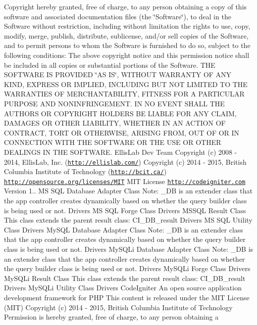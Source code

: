 \begin{DoxyCopyright}{Copyright}
hereby granted, free of charge, to any person obtaining a copy of this software and associated documentation files (the \char`\"{}\+Software\char`\"{}), to deal in the Software without restriction, including without limitation the rights to use, copy, modify, merge, publish, distribute, sublicense, and/or sell copies of the Software, and to permit persons to whom the Software is furnished to do so, subject to the following conditions\+: The above copyright notice and this permission notice shall be included in all copies or substantial portions of the Software. T\+H\+E S\+O\+F\+T\+W\+A\+R\+E I\+S P\+R\+O\+V\+I\+D\+E\+D \char`\"{}\+A\+S I\+S\char`\"{}, W\+I\+T\+H\+O\+U\+T W\+A\+R\+R\+A\+N\+T\+Y O\+F A\+N\+Y K\+I\+N\+D, E\+X\+P\+R\+E\+S\+S O\+R I\+M\+P\+L\+I\+E\+D, I\+N\+C\+L\+U\+D\+I\+N\+G B\+U\+T N\+O\+T L\+I\+M\+I\+T\+E\+D T\+O T\+H\+E W\+A\+R\+R\+A\+N\+T\+I\+E\+S O\+F M\+E\+R\+C\+H\+A\+N\+T\+A\+B\+I\+L\+I\+T\+Y, F\+I\+T\+N\+E\+S\+S F\+O\+R A P\+A\+R\+T\+I\+C\+U\+L\+A\+R P\+U\+R\+P\+O\+S\+E A\+N\+D N\+O\+N\+I\+N\+F\+R\+I\+N\+G\+E\+M\+E\+N\+T. I\+N N\+O E\+V\+E\+N\+T S\+H\+A\+L\+L T\+H\+E A\+U\+T\+H\+O\+R\+S O\+R C\+O\+P\+Y\+R\+I\+G\+H\+T H\+O\+L\+D\+E\+R\+S B\+E L\+I\+A\+B\+L\+E F\+O\+R A\+N\+Y C\+L\+A\+I\+M, D\+A\+M\+A\+G\+E\+S O\+R O\+T\+H\+E\+R L\+I\+A\+B\+I\+L\+I\+T\+Y, W\+H\+E\+T\+H\+E\+R I\+N A\+N A\+C\+T\+I\+O\+N O\+F C\+O\+N\+T\+R\+A\+C\+T, T\+O\+R\+T O\+R O\+T\+H\+E\+R\+W\+I\+S\+E, A\+R\+I\+S\+I\+N\+G F\+R\+O\+M, O\+U\+T O\+F O\+R I\+N C\+O\+N\+N\+E\+C\+T\+I\+O\+N W\+I\+T\+H T\+H\+E S\+O\+F\+T\+W\+A\+R\+E O\+R T\+H\+E U\+S\+E O\+R O\+T\+H\+E\+R D\+E\+A\+L\+I\+N\+G\+S I\+N T\+H\+E S\+O\+F\+T\+W\+A\+R\+E.  Ellis\+Lab Dev Team  Copyright (c) 2008 -\/ 2014, Ellis\+Lab, Inc. (\href{http://ellislab.com/}{\tt http\+://ellislab.\+com/})  Copyright (c) 2014 -\/ 2015, British Columbia Institute of Technology (\href{http://bcit.ca/}{\tt http\+://bcit.\+ca/})  \href{http://opensource.org/licenses/MIT}{\tt http\+://opensource.\+org/licenses/\+M\+I\+T} M\+I\+T License  \href{http://codeigniter.com}{\tt http\+://codeigniter.\+com}  Version 1..  M\+S S\+Q\+L Database Adapter Class Note\+: \+\_\+\+D\+B is an extender class that the app controller creates dynamically based on whether the query builder class is being used or not.  Drivers M\+S S\+Q\+L Forge Class  Drivers M\+S\+S\+Q\+L Result Class This class extends the parent result class\+: C\+I\+\_\+\+D\+B\+\_\+result  Drivers M\+S S\+Q\+L Utility Class  Drivers My\+S\+Q\+L Database Adapter Class Note\+: \+\_\+\+D\+B is an extender class that the app controller creates dynamically based on whether the query builder class is being used or not.  Drivers My\+S\+Q\+Li Database Adapter Class Note\+: \+\_\+\+D\+B is an extender class that the app controller creates dynamically based on whether the query builder class is being used or not.  Drivers My\+S\+Q\+Li Forge Class  Drivers My\+S\+Q\+Li Result Class This class extends the parent result class\+: C\+I\+\_\+\+D\+B\+\_\+result  Drivers My\+S\+Q\+Li Utility Class  Drivers Code\+Igniter An open source application development framework for P\+H\+P This content is released under the M\+I\+T License (M\+I\+T) Copyright (c) 2014 -\/ 2015, British Columbia Institute of Technology Permission is hereby granted, free of charge, to any person obtaining a 
\end{DoxyCopyright}
